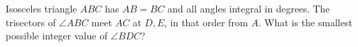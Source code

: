 Isosceles triangle $ABC$ has $AB=BC$ and all angles integral in degrees. The trisectors of $\angle ABC$ meet $AC$ at $D,E$, in that order from $A$. What is the smallest possible integer value of $\angle BDC$?
